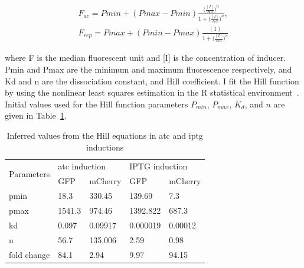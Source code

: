 \begin{align}
 	F_{ac} = Pmin + (Pmax - Pmin)\frac{\Big(\frac{[I]}{Kd}\Big)^n}{1+\Big(\frac{[I]}{Kd}\Big)^n},\\
 	F_{rep} = Pmax + (Pmin - Pmax)\frac{(1)}{1+\Big(\frac{[I]}{Kd}\Big)^n}
\end{align}
 
where F is the median fluorescent unit and [I] is the concentration of inducer. Pmin and Pmax are the minimum and maximum fluorescence respectively, and Kd and n are the dissociation constant, and Hill coefficient. I fit the Hill function by using the nonlinear least squares estimation in the R statistical environment~\autocite{R:2008}. Initial values used for the Hill function parameters $P_{min}$, $P_{max}$, $K_d$, and $n$ are given in Table~\ref{tab:hill_initial}.




\begin{table}[htbp]
\centering
\caption{Inferred values from the Hill equations in \acrshort{atc} and \acrshort{iptg} inductions}
\label{tab:hill_initial}
\begin{tabular}{@{}lllll@{}}
\toprule
\multirow{2}{*}{Parameters} & \multicolumn{2}{l}{\acrshort{atc} induction} & \multicolumn{2}{l}{IPTG induction} \\ \cmidrule(l){2-5} 
 & GFP & mCherry & GFP & mCherry \\ \midrule
pmin & 18.3 & 330.45 & 139.69 & 7.3 \\
pmax & 1541.3 & 974.46 & 1392.822 & 687.3 \\
kd & 0.097 & 0.09917 & 0.000019 & 0.00012\\
n & 56.7 & 135.006 & 2.59 & 0.98\\ 
fold change & 84.1 & 2.94 & 9.97 & 94.15 \\ \bottomrule
\end{tabular}
\end{table}

